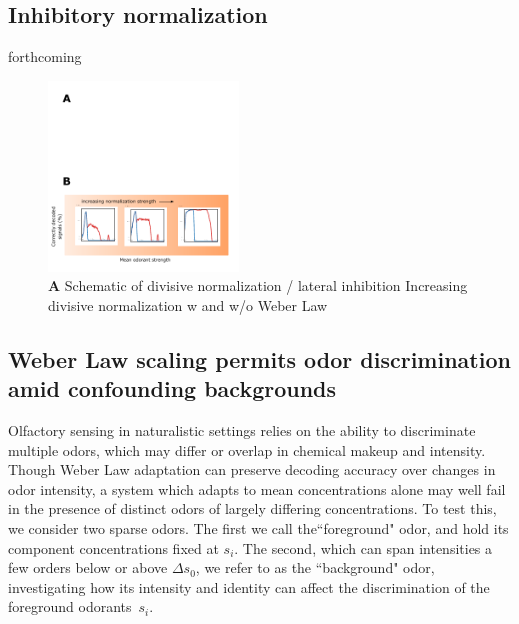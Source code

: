 \subsection{Inhibitory normalization}

{\color{blue} forthcoming}





\begin{figure}
	\includegraphics[width=0.45\textwidth]{figures/Figures_signal_decoding_weber_law_2}
	\caption{\textbf{A} Schematic of divisive normalization / lateral inhibition  Increasing divisive normalization w and w/o Weber Law}
	\label{fig:divisive_normalization}
\end{figure}






\subsection{Weber Law scaling permits odor discrimination amid confounding backgrounds}


Olfactory sensing in naturalistic settings relies on the ability to discriminate multiple odors, which may differ or overlap in chemical makeup and intensity. Though Weber Law adaptation can preserve decoding accuracy over changes in odor intensity, a system which adapts to mean concentrations alone may well fail in the presence of distinct odors of largely differing concentrations. To test this, we consider two sparse odors. The first we call the``foreground" odor, and hold its component concentrations fixed at $s_i$. The second, which can span intensities a few orders below or above $\Delta s_0$, we refer to as the ``background" odor, investigating how its intensity and identity can affect the discrimination of the foreground odorants~$s_i$. 

